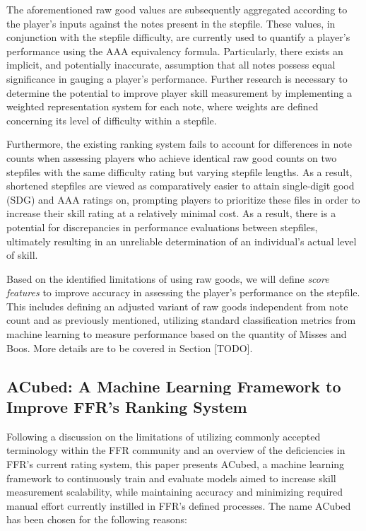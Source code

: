 The aforementioned raw good values are subsequently aggregated according to the player's inputs against the notes present in the stepfile. These values, in conjunction with the stepfile difficulty, are currently used to quantify a player's performance using the AAA equivalency formula. Particularly, there exists an implicit, and potentially inaccurate, assumption that all notes possess equal significance in gauging a player's performance. Further research is necessary to determine the potential to improve player skill measurement by implementing a weighted representation system for each note, where weights are defined concerning its level of difficulty within a stepfile. 

\vspace{2mm}

Furthermore, the existing ranking system fails to account for differences in note counts when assessing players who achieve identical raw good counts on two stepfiles with the same difficulty rating but varying stepfile lengths. As a result, shortened stepfiles are viewed as comparatively easier to attain single-digit good (SDG) and AAA ratings on, prompting players to prioritize these files in order to increase their skill rating at a relatively minimal cost. As a result, there is a potential for discrepancies in performance evaluations between stepfiles, ultimately resulting in an unreliable determination of an individual's actual level of skill.

\vspace{2mm}

Based on the identified limitations of using raw goods, we will define \textit{score features} to improve accuracy in assessing the player's performance on the stepfile. This includes defining an adjusted variant of raw goods independent from note count and as previously mentioned, utilizing standard classification metrics from machine learning to measure performance based on the quantity of Misses and Boos. More details are to be covered in Section [TODO].

\subsection{ACubed: A Machine Learning Framework to Improve FFR's Ranking System}

Following a discussion on the limitations of utilizing commonly accepted terminology within the FFR community and an overview of the deficiencies in FFR's current rating system, this paper presents ACubed, a machine learning framework to continuously train and evaluate models aimed to increase skill measurement scalability, while maintaining accuracy and minimizing required manual effort currently instilled in FFR's defined processes. The name ACubed has been chosen for the following reasons:

